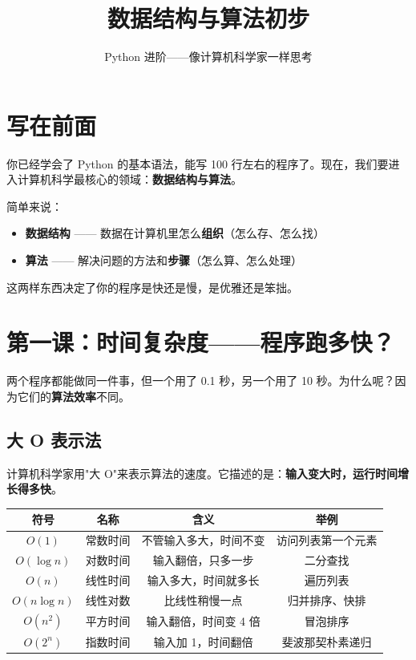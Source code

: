 \documentclass[a4paper,12pt]{ctexart}
\title{\textcolor{blue!70!black}{\Huge\textbf{数据结构与算法初步}}}
\author{Python 进阶——像计算机科学家一样思考}
\date{}
\begin{document}
\maketitle
\thispagestyle{empty}

\section*{写在前面}

你已经学会了 Python 的基本语法，能写 100 行左右的程序了。现在，我们要进入计算机科学最核心的领域：\textbf{数据结构与算法}。

简单来说：
\begin{itemize}
  \item \textbf{数据结构} —— 数据在计算机里怎么\textbf{组织}（怎么存、怎么找）
  \item \textbf{算法} —— 解决问题的方法和\textbf{步骤}（怎么算、怎么处理）
\end{itemize}

这两样东西决定了你的程序是快还是慢，是优雅还是笨拙。

\section*{第一课：时间复杂度——程序跑多快？}

两个程序都能做同一件事，但一个用了 0.1 秒，另一个用了 10 秒。为什么呢？因为它们的\textbf{算法效率}不同。

\subsection*{大 O 表示法}

计算机科学家用"大 O"来表示算法的速度。它描述的是：\textbf{输入变大时，运行时间增长得多快}。

\begin{center}
\begin{tabular}{|c|c|c|c|}
\hline
\textbf{符号} & \textbf{名称} & \textbf{含义} & \textbf{举例} \\ \hline
$O(1)$ & 常数时间 & 不管输入多大，时间不变 & 访问列表第一个元素 \\ \hline
$O(\log n)$ & 对数时间 & 输入翻倍，只多一步 & 二分查找 \\ \hline
$O(n)$ & 线性时间 & 输入多大，时间就多长 & 遍历列表 \\ \hline
$O(n \log n)$ & 线性对数 & 比线性稍慢一点 & 归并排序、快排 \\ \hline
$O(n^2)$ & 平方时间 & 输入翻倍，时间变 4 倍 & 冒泡排序 \\ \hline
$O(2^n)$ & 指数时间 & 输入加 1，时间翻倍 & 斐波那契朴素递归 \\ \hline
\end{tabular}
\end{center}
\end{document}
